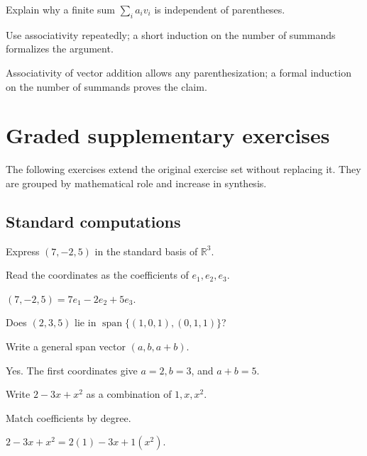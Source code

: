 \begin{exercise}\label{exr:i01-08}
Explain why a finite sum $\sum_i a_i v_i$ is independent of parentheses.
\end{exercise}
\begin{hint}
Use associativity repeatedly; a short induction on the number of summands formalizes the argument.
\end{hint}
\begin{solution}
Associativity of vector addition allows any parenthesization; a formal induction on the number of summands proves the claim.
\end{solution}


\section{Graded supplementary exercises}
The following exercises extend the original exercise set without replacing it. They are grouped by mathematical role and increase in synthesis.

\subsection*{Standard computations}

\begin{exercise}\label{exr:i01-expand-01}
Express \((7,-2,5)\) in the standard basis of \(\mathbb R^3\).
\end{exercise}
\begin{hint}
Read the coordinates as the coefficients of \(e_1,e_2,e_3\).
\end{hint}
\begin{solution}
\((7,-2,5)=7e_1-2e_2+5e_3\).
\end{solution}

\begin{exercise}\label{exr:i01-expand-02}
Does \((2,3,5)\) lie in \(\operatorname{span}\{(1,0,1),(0,1,1)\}\)?
\end{exercise}
\begin{hint}
Write a general span vector \((a,b,a+b)\).
\end{hint}
\begin{solution}
Yes. The first coordinates give \(a=2,b=3\), and \(a+b=5\).
\end{solution}

\begin{exercise}\label{exr:i01-expand-03}
Write \(2-3x+x^2\) as a combination of \(1,x,x^2\).
\end{exercise}
\begin{hint}
Match coefficients by degree.
\end{hint}
\begin{solution}
\(2-3x+x^2=2(1)-3x+1(x^2)\).
\end{solution}

